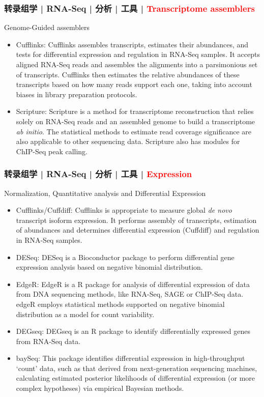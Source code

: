 \begin{frame}
  \frametitle{转录组学 | RNA-Seq | 分析 | 工具 | \textcolor{red}{Transcriptome assemblers}}
  \begin{block}{Genome-Guided assemblers}
    \begin{itemize}
      \item Cufflinks: Cufflinks assembles transcripts, estimates their abundances, and tests for differential expression and regulation in RNA-Seq samples. It accepts aligned RNA-Seq reads and assembles the alignments into a parsimonious set of transcripts. Cufflinks then estimates the relative abundances of these transcripts based on how many reads support each one, taking into account biases in library preparation protocols.
      \item Scripture: Scripture is a method for transcriptome reconstruction that relies solely on RNA-Seq reads and an assembled genome to build a transcriptome \textit{ab initio}. The statistical methods to estimate read coverage significance are also applicable to other sequencing data. Scripture also has modules for ChIP-Seq peak calling.
    \end{itemize}
  \end{block}
\end{frame}

\begin{frame}
  \frametitle{转录组学 | RNA-Seq | 分析 | 工具 | \textcolor{red}{Expression}}
  {\footnotesize
  \begin{block}{Normalization, Quantitative analysis and Differential Expression}
    \begin{itemize}
      \item Cufflinks/Cuffdiff: Cufflinks is appropriate to measure global \textit{de novo} transcript isoform expression. It performs assembly of transcripts, estimation of abundances and determines differential expression (Cuffdiff) and regulation in RNA-Seq samples.
      \item DESeq: DESeq is a Bioconductor package to perform differential gene expression analysis based on negative binomial distribution.
      \item EdgeR: EdgeR is a R package for analysis of differential expression of data from DNA sequencing methods, like RNA-Seq, SAGE or ChIP-Seq data. edgeR employs statistical methods supported on negative binomial distribution as a model for count variability.
      \item DEGseq: DEGseq is an R package to identify differentially expressed genes from RNA-Seq data.
      \item baySeq: This package identifies differential expression in high-throughput `count' data, such as that derived from next-generation sequencing machines, calculating estimated posterior likelihoods of differential expression (or more complex hypotheses) via empirical Bayesian methods.
    \end{itemize}
  \end{block}
}
\end{frame}

